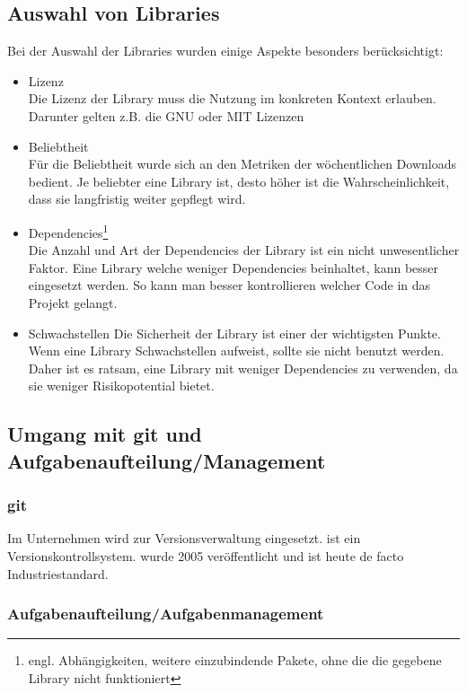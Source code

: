 \subsection{Auswahl von Libraries}
\label{sec:Durchführungsphase:AuswahlVonLibraries}

Bei der Auswahl der Libraries wurden einige Aspekte besonders berücksichtigt:

\begin{itemize}
    \item Lizenz\\
    Die Lizenz der Library muss die Nutzung im konkreten Kontext erlauben. Darunter gelten z.B. die GNU oder MIT Lizenzen
    \item Beliebtheit\\
    Für die Beliebtheit wurde sich an den Metriken der wöchentlichen Downloads bedient. Je beliebter eine Library ist, desto höher ist die Wahrscheinlichkeit, dass sie langfristig weiter gepflegt wird.
    \item Dependencies\footnote{engl. Abhängigkeiten, weitere einzubindende Pakete, ohne die die gegebene Library nicht funktioniert}\\
	Die Anzahl und Art der Dependencies der Library ist ein nicht unwesentlicher Faktor. Eine Library welche weniger Dependencies beinhaltet, kann besser eingesetzt werden. So kann man besser kontrollieren welcher Code in das Projekt gelangt.
	\item Schwachstellen
	Die Sicherheit der Library ist einer der wichtigsten Punkte. Wenn eine Library Schwachstellen aufweist, sollte sie nicht benutzt werden. Daher ist es ratsam, eine Library mit weniger Dependencies zu verwenden, da sie weniger Risikopotential bietet.   
\end{itemize}

\subsection{Umgang mit git und Aufgabenaufteilung/Management}

\subsubsection{git}

Im Unternehmen wird  zur Versionsverwaltung eingesetzt.  ist ein Versionskontrollsystem.  wurde 2005 veröffentlicht und ist heute de facto Industriestandard. 

\subsubsection{Aufgabenaufteilung/Aufgabenmanagement}

